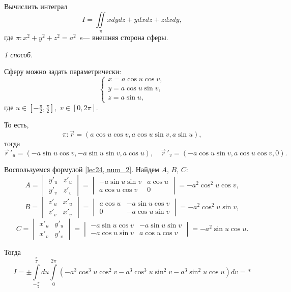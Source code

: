 \documentclass[../../main.tex]{subfiles}
\begin{document}
\begin{example}
	Вычислить интеграл \[I = \iint\limits_\pi xdydz + ydxdz + zdxdy,\] где $\pi:
	 x^2 + y^2 + z^2 = a^2$~s--- внешняя сторона сферы.
	\smallskip
	
	\noindent\emph{1 способ.}
		
	Сферу можно задать параметрически:
	\[\begin{cases}	x = a \cos u \cos v,\\
		y = a \cos u \sin v,\\
		z = a \sin u,
	\end{cases}\]
	где $u \in [-\frac{\pi}{2}, \frac{\pi}{2}],$ $v \in [0, 2\pi].$
	
	То есть, \[\pi: \vec{r} = ( a \cos u \cos v,  a \cos u \sin v, a \sin u),\] 
	тогда \[\vec r\,'_u = (-a \sin u \cos v, -a \sin u \sin v, a \cos u),\quad
	 \vec r\,'_v = (-a \cos u \sin v, a \cos u \cos v, 0).\]
	
	Воспользуемся формулой \eqref{lec24, num_2}. Найдем $A$, $B$, $C$: \[A=\begin{vmatrix}
	y'_u & z'_u\\
	y'_v & z'_v
	\end{vmatrix} = \begin{vmatrix}
	-a \sin u \sin v & a \cos u\\
	 a \cos u \cos v & 0
	\end{vmatrix} = -a^2 \cos^2 u \cos v,\] \[B=\begin{vmatrix}
	z'_u & x'_u\\
	z'_v & x'_v
	\end{vmatrix} = \begin{vmatrix}
	a \cos u & -a \sin u \cos v\\
	0 & -a \cos u \sin v
	\end{vmatrix} = -a^2 \cos^2 u \sin v,\]
	\begin{equation}C=\begin{vmatrix}
	x'_u & y'_u\\
	x'_v & y'_v
	\end{vmatrix} = \begin{vmatrix}
	-a \sin u \cos v & -a \sin u \sin v\\
	-a \cos u \sin v & a \cos u \cos v
	\end{vmatrix} = -a^2 \sin u \cos u.
	\label{lec24, num_2.5}
	\end{equation}
	
	Тогда \[I = \pm\int\limits_{-\frac{\pi}{2}}^{\frac{\pi}{2}}du\int\limits_0^
	{2\pi}(-a^3\cos^3 u \cos^2 v - a^3\cos^3 u \sin^2 v - a^3\sin^2 u \cos u)dv
	 = *\]
	

\end{example}
\end{document}
